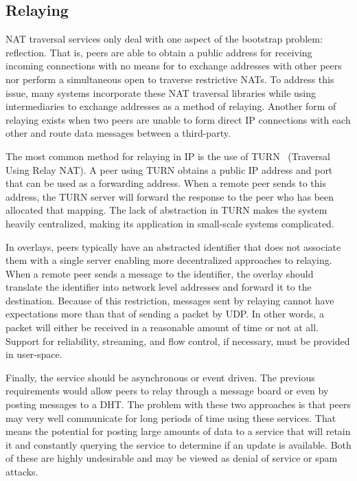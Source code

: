 \subsection{Relaying}
\label{bs:relay}

NAT traversal services only deal with one aspect of the bootstrap problem:
reflection.  That is, peers are able to obtain a public address for receiving
incoming connections with no means for to exchange addresses with other peers
nor perform a simultaneous open to traverse restrictive NATs.  To address this
issue, many systems incorporate these NAT traversal libraries while using
intermediaries to exchange addresses as a method of relaying.  Another form of
relaying exists when two peers are unable to form direct IP connections with
each other and route data messages between a third-party.

The most common method for relaying in IP is the use of TURN~\cite{turn}
(Traversal Using Relay NAT).  A peer using TURN obtains a public IP address and
port that can be used as a forwarding address.  When a remote peer sends to
this address, the TURN server will forward the response to the peer who has
been allocated that mapping.  The lack of abstraction in TURN makes the system
heavily centralized, making its application in small-scale systems complicated.  

In overlays, peers typically have an abstracted identifier that does not
associate them with a single server enabling more decentralized approaches to
relaying.  When a remote peer sends a message to the identifier, the overlay
should translate the identifier into network level addresses and forward it to
the destination.  Because of this restriction, messages sent by relaying cannot
have expectations more than that of sending a packet by UDP.  In other words, a
packet will either be received in a reasonable amount of time or not at all.
Support for reliability, streaming, and flow control, if necessary, must be
provided in user-space.

Finally, the service should be asynchronous or event driven.  The previous
requirements would allow peers to relay through a message board or even by
posting messages to a DHT.  The problem with these two approaches is that peers
may very well communicate for long periods of time using these services.  That
means the potential for posting large amounts of data to a service that will
retain it and constantly querying the service to determine if an update is
available.  Both of these are highly undesirable and may be viewed as denial of
service or spam attacks.

